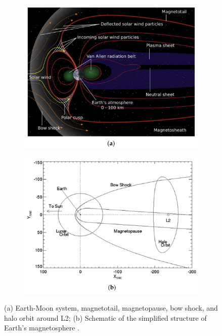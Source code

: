 \documentclass[12pt]{article}
\begin{document}
\begin{figure}[ht]
    \centering
    \begin{subfigure}[b]{.45\textwidth}
        \centering
        \includegraphics[width=\linewidth]{ariel mag1.png}
    \end{subfigure}
    \hspace{-.5em}
    \begin{subfigure}[b]{.45\textwidth}
        \centering
        \includegraphics[width=\linewidth]{ariel mag2 simple.png}
    \end{subfigure}
    \caption{(a) Earth-Moon system, magnetotail, magnetopause, bow shock, and halo orbit around L2; (b) Schematic of the simplified structure of Earth's magnetosphere \protect\cite{Michelagnoli_Focardi_Pudney_Renouf_Merola_Noce_Nunez_Dinuzzi_Chiarucci_2024}.}
    \label{fig:11}
\end{figure}
\end{document}
